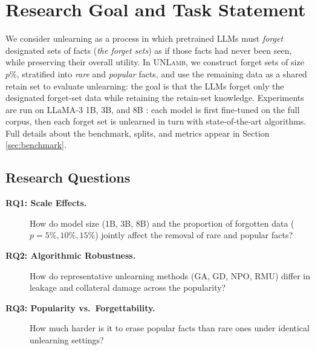 \section{Research Goal and Task Statement}
\label{sec:objectives}

We consider unlearning as a process in which pretrained LLMs must \emph{forget} designated sets of facts (\emph{the forget sets}) as if those facts had never been seen, while preserving their overall utility. In \textsc{UNLamb}, we construct forget sets of size $p\%$, stratified into \emph{rare} and \emph{popular} facts, and use the remaining data as a shared retain set to evaluate unlearning: the goal is that the LLMs forget only the designated forget-set data while retaining the retain-set knowledge. %
Experiments are run on LLaMA-3 1B, 3B, and 8B \cite{grattafiori2024llama}: each model is first fine‑tuned on the full corpus, then each forget set is unlearned in turn with state‑of‑the‑art algorithms. Full details about the benchmark, splits, and metrics appear in Section \ref{sec:benchmark}.

\subsection{Research Questions}
\label{sec:rq}


\begin{description}
    \item[\textbf{RQ1: Scale Effects.}]  
     How do model size (1B, 3B, 8B) and the proportion of forgotten data ($p=5\%,10\%,15\%$) jointly affect the removal of rare and popular facts?

     \item[\textbf{RQ2: Algorithmic Robustness.}]  
    How do representative unlearning methods (\textsc{GA}, \textsc{GD}, \textsc{NPO}, \textsc{RMU}) differ in leakage and collateral damage across the popularity?

     \item[\textbf{RQ3: Popularity vs.\ Forgettability.}]  
    How much harder is it to erase popular facts than rare ones under identical unlearning settings?
\end{description}

